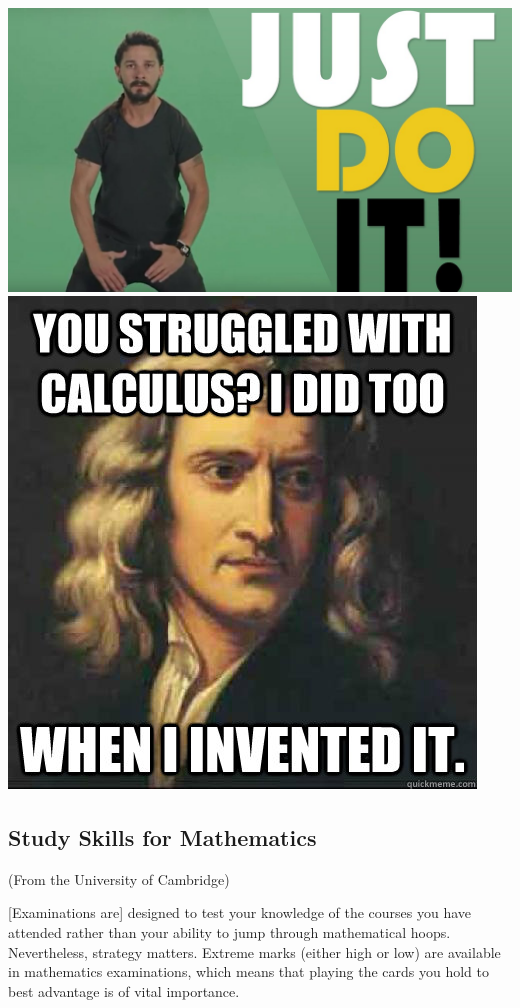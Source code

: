 \documentclass{exam}
\theoremstyle{definition}
\begin{document}
\begin{center}
  \includegraphics[height=0.2\textheight]{justdoit}
  \includegraphics[height=0.2\textheight]{meme2}
\end{center}

\clearpage
\subsection*{Study Skills for Mathematics}
(From the University of Cambridge)

[Examinations are] designed to test your knowledge of the courses you have attended rather than your ability to jump through mathematical hoops. Nevertheless, strategy matters. Extreme marks (either high or low) are available in mathematics examinations, which means that playing the cards you hold to best advantage is of vital importance.
\end{document}

